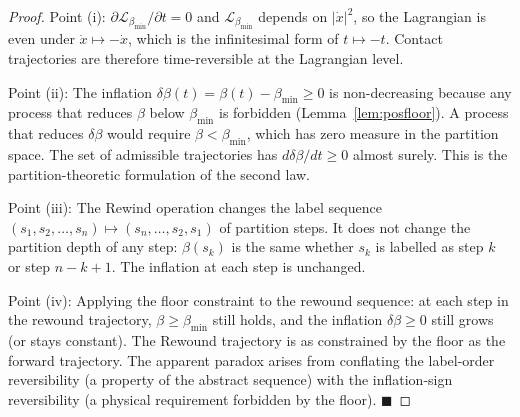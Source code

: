 \documentclass[11pt,twocolumn,a4paper]{article}
\theoremstyle{plain}
\theoremstyle{definition}
\theoremstyle{remark}
\newcommand{\bmin}{\beta_{\min}}
\newcommand{\Lmin}{\mathcal{L}_{\bmin}}
\renewcommand{\qed}{\hfill$\blacksquare$}
\begin{document}
\begin{proof}
Point (i): $\partial\Lmin/\partial t = 0$ and $\Lmin$ depends on $|\dot{x}|^2$,
so the Lagrangian is even under $\dot{x} \mapsto -\dot{x}$, which is the
infinitesimal form of $t \mapsto -t$. Contact trajectories are therefore
time-reversible at the Lagrangian level.

Point (ii): The inflation $\delta\beta(t) = \beta(t) - \bmin \geq 0$ is
non-decreasing because any process that reduces $\beta$ below $\bmin$ is
forbidden (Lemma~\ref{lem:posfloor}). A process that reduces $\delta\beta$
would require $\beta < \bmin$, which has zero measure in the partition space.
The set of admissible trajectories has $d\delta\beta/dt \geq 0$ almost surely.
This is the partition-theoretic formulation of the second law.

Point (iii): The Rewind operation changes the label sequence $(s_1, s_2, \ldots,
s_n) \mapsto (s_n, \ldots, s_2, s_1)$ of partition steps. It does not change
the partition depth of any step: $\beta(s_k)$ is the same whether $s_k$ is
labelled as step $k$ or step $n-k+1$. The inflation at each step is unchanged.

Point (iv): Applying the floor constraint to the rewound sequence: at each step
in the rewound trajectory, $\beta \geq \bmin$ still holds, and the inflation
$\delta\beta \geq 0$ still grows (or stays constant). The Rewound trajectory
is as constrained by the floor as the forward trajectory. The apparent paradox
arises from conflating the label-order reversibility (a property of the abstract
sequence) with the inflation-sign reversibility (a physical requirement forbidden
by the floor). \qed
\end{proof}
\end{document}
